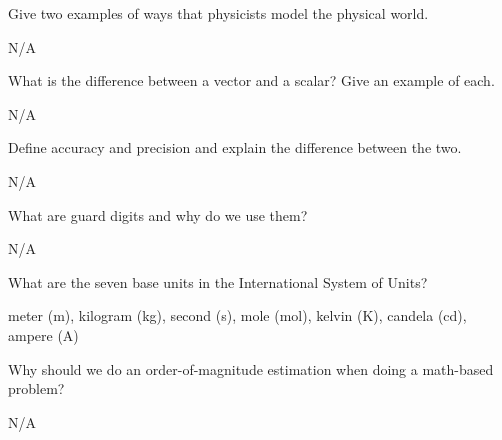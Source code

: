 


\begin{question}[ID=IM-Q01,topic=intro,difficulty=C]
    Give two examples of ways that physicists model the physical world.
\end{question}
\begin{solution}
    N/A
\end{solution}


\begin{question}[ID=IM-Q02,topic=intro,difficulty=C]
    What is the difference between a vector and a scalar?
    Give an example of each.
\end{question}
\begin{solution}
    N/A
\end{solution}


\begin{question}[ID=IM-Q03,topic=intro,difficulty=C]
    Define accuracy and precision and explain the difference between the two.
\end{question}
\begin{solution}
    N/A
\end{solution}


\begin{question}[ID=IM-Q04,topic=intro,difficulty=C]
    What are guard digits and why do we use them?
\end{question}
\begin{solution}
    N/A
\end{solution}


\begin{question}[ID=IM-Q05,topic=intro,difficulty=C]
    What are the seven base units in the International System of Units?
\end{question}
\begin{solution}
    meter (\si{\meter}), kilogram (\si{\kilo\gram}),
    second (\si{\second}), mole (\si{\mole}),
    kelvin (\si{\kelvin}), candela (\si{\candela}),
    ampere (\si{\ampere})
\end{solution}


\begin{question}[ID=IM-Q06,topic=intro,difficulty=C]
    Why should we do an order-of-magnitude estimation when
        doing a math-based problem?
\end{question}
\begin{solution}
    N/A
\end{solution}


